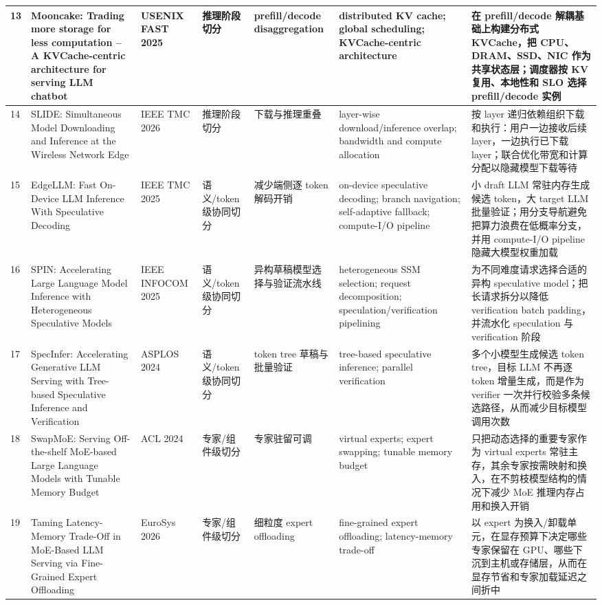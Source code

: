 \documentclass[a4paper,10pt]{ctexart}
\begin{document}
\begin{table}[H]
\begin{tabularx}{\textwidth}{|X|X|X|X|X|X|X|}
13 & Mooncake: Trading more storage for less computation -- A KVCache-centric architecture for serving LLM chatbot & USENIX FAST 2025 & 推理阶段切分 & prefill/decode disaggregation & distributed KV cache; global scheduling; KVCache-centric architecture & 在 prefill/decode 解耦基础上构建分布式 KVCache，把 CPU、DRAM、SSD、NIC 作为共享状态层；调度器按 KV 复用、本地性和 SLO 选择 prefill/decode 实例 \\ \hline
14 & SLIDE: Simultaneous Model Downloading and Inference at the Wireless Network Edge & IEEE TMC 2026 & 推理阶段切分 & 下载与推理重叠 & layer-wise download/inference overlap; bandwidth and compute allocation & 按 layer 递归依赖组织下载和执行：用户一边接收后续 layer，一边执行已下载 layer；联合优化带宽和计算分配以隐藏模型下载等待 \\ \hline
15 & EdgeLLM: Fast On-Device LLM Inference With Speculative Decoding & IEEE TMC 2025 & 语义/token 级协同切分 & 减少端侧逐 token 解码开销 & on-device speculative decoding; branch navigation; self-adaptive fallback; compute-I/O pipeline & 小 draft LLM 常驻内存生成候选 token，大 target LLM 批量验证；用分支导航避免把算力浪费在低概率分支，并用 compute-I/O pipeline 隐藏大模型权重加载 \\ \hline
16 & SPIN: Accelerating Large Language Model Inference with Heterogeneous Speculative Models & IEEE INFOCOM 2025 & 语义/token 级协同切分 & 异构草稿模型选择与验证流水线 & heterogeneous SSM selection; request decomposition; speculation/verification pipelining & 为不同难度请求选择合适的异构 speculative model；把长请求拆分以降低 verification batch padding，并流水化 speculation 与 verification 阶段 \\ \hline
17 & SpecInfer: Accelerating Generative LLM Serving with Tree-based Speculative Inference and Verification & ASPLOS 2024 & 语义/token 级协同切分 & token tree 草稿与批量验证 & tree-based speculative inference; parallel verification & 多个小模型生成候选 token tree，目标 LLM 不再逐 token 增量生成，而是作为 verifier 一次并行校验多条候选路径，从而减少目标模型调用次数 \\ \hline
18 & SwapMoE: Serving Off-the-shelf MoE-based Large Language Models with Tunable Memory Budget & ACL 2024 & 专家/组件级切分 & 专家驻留可调 & virtual experts; expert swapping; tunable memory budget & 只把动态选择的重要专家作为 virtual experts 常驻主存，其余专家按需映射和换入，在不剪枝模型结构的情况下减少 MoE 推理内存占用和换入开销 \\ \hline
19 & Taming Latency-Memory Trade-Off in MoE-Based LLM Serving via Fine-Grained Expert Offloading & EuroSys 2026 & 专家/组件级切分 & 细粒度 expert offloading & fine-grained expert offloading; latency-memory trade-off & 以 expert 为换入/卸载单元，在显存预算下决定哪些专家保留在 GPU、哪些下沉到主机或存储层，从而在显存节省和专家加载延迟之间折中 \\ \hline

\end{tabularx}
\end{table}
\end{document}
